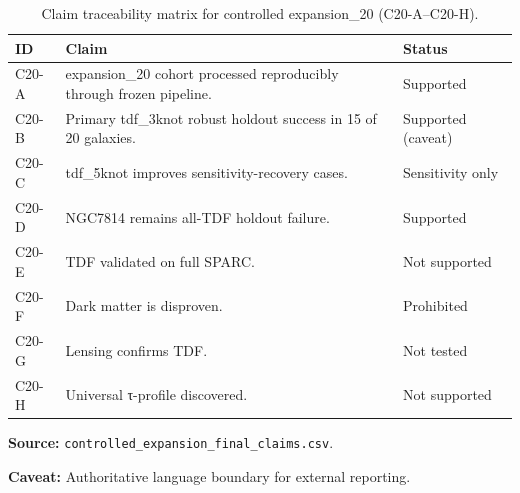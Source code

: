 \begin{table}[htbp]
\centering
\caption{Claim traceability matrix for controlled expansion\_20 (C20-A--C20-H).}
\label{tab:claims-matrix}
\scriptsize
\begin{tabular}{@{}p{1.1cm} p{10.2cm} p{2.8cm}@{}}
\toprule
ID & Claim & Status \\
\midrule
C20-A & expansion\_20 cohort processed reproducibly through frozen pipeline. & Supported \\
C20-B & Primary tdf\_3knot robust holdout success in 15 of 20 galaxies. & Supported (caveat) \\
C20-C & tdf\_5knot improves sensitivity-recovery cases. & Sensitivity only \\
C20-D & NGC7814 remains all-TDF holdout failure. & Supported \\
C20-E & TDF validated on full SPARC. & Not supported \\
C20-F & Dark matter is disproven. & Prohibited \\
C20-G & Lensing confirms TDF. & Not tested \\
C20-H & Universal τ-profile discovered. & Not supported \\
\bottomrule
\end{tabular}
\vspace{0.4em}
{\footnotesize
\par\noindent\textbf{Source:} \texttt{controlled\_expansion\_final\_claims.csv}.
\par\noindent\textbf{Caveat:} Authoritative language boundary for external reporting.
\par
}
\end{table}
